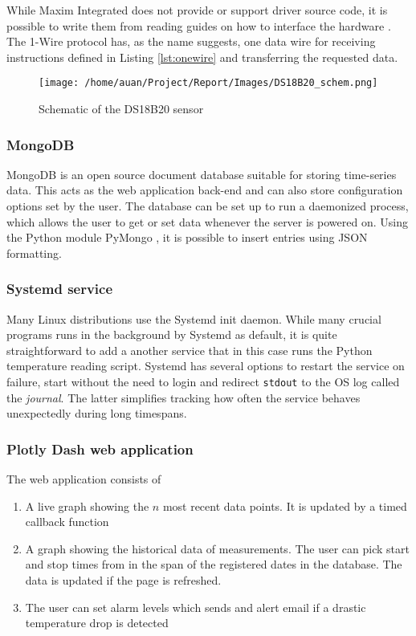 While Maxim Integrated does not provide or support driver source code, it is possible to write them from reading guides on how to interface the hardware \cite{DS18B20ProgrammableResolution}. The 1-Wire protocol has, as the name suggests, one data wire for receiving instructions defined in Listing \ref{lst:onewire} and transferring the requested data.

\begin{figure}[h]
  \centering
  \texttt{[image: /home/auan/Project/Report/Images/DS18B20\_schem.png]}
  \caption{Schematic of the DS18B20 sensor}
  \label{fig:sensorschem}
\end{figure}
\subsubsection{MongoDB}%
\label{ssub:mongodb}
MongoDB is an open source document database suitable for storing time-series data. This acts as the web application back-end and can also store configuration options set by the user. The database can be set up to run a daemonized process, which allows the user to get or set data whenever the server is powered on. Using the Python module PyMongo \cite{PyMongo}, it is possible to insert entries using JSON formatting.

\subsubsection{Systemd service}%
\label{ssub:systemd_service}
Many Linux distributions use the Systemd init daemon. While many crucial programs runs in the background by Systemd as default, it is quite straightforward to add a another service that in this case runs the Python temperature reading script. Systemd has several options to restart the service on failure, start without the need to login and redirect \verb|stdout| to the OS log called the \textit{journal}. The latter simplifies tracking how often the service behaves unexpectedly during long timespans.



\subsubsection{Plotly Dash web application}%
\label{ssub:plotly_dash_web_application}
The web application consists of
\begin{enumerate}
  \item A live graph showing the $n$ most recent data points. It is updated by a timed callback function
  \item A graph showing the historical data of measurements. The user can pick start and stop times from in the span of the registered dates in the database. The data is updated if the page is refreshed.
  \item The user can set alarm levels which sends and alert email if a drastic temperature drop is detected
\end{enumerate}


